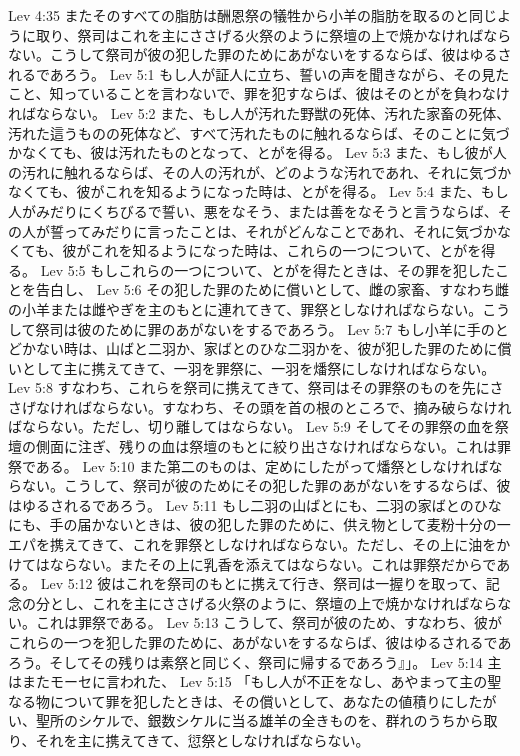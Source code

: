 Lev 4:35  またそのすべての脂肪は酬恩祭の犠牲から小羊の脂肪を取るのと同じように取り、祭司はこれを主にささげる火祭のように祭壇の上で焼かなければならない。こうして祭司が彼の犯した罪のためにあがないをするならば、彼はゆるされるであろう。
Lev 5:1  もし人が証人に立ち、誓いの声を聞きながら、その見たこと、知っていることを言わないで、罪を犯すならば、彼はそのとがを負わなければならない。
Lev 5:2  また、もし人が汚れた野獣の死体、汚れた家畜の死体、汚れた這うものの死体など、すべて汚れたものに触れるならば、そのことに気づかなくても、彼は汚れたものとなって、とがを得る。
Lev 5:3  また、もし彼が人の汚れに触れるならば、その人の汚れが、どのような汚れであれ、それに気づかなくても、彼がこれを知るようになった時は、とがを得る。
Lev 5:4  また、もし人がみだりにくちびるで誓い、悪をなそう、または善をなそうと言うならば、その人が誓ってみだりに言ったことは、それがどんなことであれ、それに気づかなくても、彼がこれを知るようになった時は、これらの一つについて、とがを得る。
Lev 5:5  もしこれらの一つについて、とがを得たときは、その罪を犯したことを告白し、
Lev 5:6  その犯した罪のために償いとして、雌の家畜、すなわち雌の小羊または雌やぎを主のもとに連れてきて、罪祭としなければならない。こうして祭司は彼のために罪のあがないをするであろう。
Lev 5:7  もし小羊に手のとどかない時は、山ばと二羽か、家ばとのひな二羽かを、彼が犯した罪のために償いとして主に携えてきて、一羽を罪祭に、一羽を燔祭にしなければならない。
Lev 5:8  すなわち、これらを祭司に携えてきて、祭司はその罪祭のものを先にささげなければならない。すなわち、その頭を首の根のところで、摘み破らなければならない。ただし、切り離してはならない。
Lev 5:9  そしてその罪祭の血を祭壇の側面に注ぎ、残りの血は祭壇のもとに絞り出さなければならない。これは罪祭である。
Lev 5:10  また第二のものは、定めにしたがって燔祭としなければならない。こうして、祭司が彼のためにその犯した罪のあがないをするならば、彼はゆるされるであろう。
Lev 5:11  もし二羽の山ばとにも、二羽の家ばとのひなにも、手の届かないときは、彼の犯した罪のために、供え物として麦粉十分の一エパを携えてきて、これを罪祭としなければならない。ただし、その上に油をかけてはならない。またその上に乳香を添えてはならない。これは罪祭だからである。
Lev 5:12  彼はこれを祭司のもとに携えて行き、祭司は一握りを取って、記念の分とし、これを主にささげる火祭のように、祭壇の上で焼かなければならない。これは罪祭である。
Lev 5:13  こうして、祭司が彼のため、すなわち、彼がこれらの一つを犯した罪のために、あがないをするならば、彼はゆるされるであろう。そしてその残りは素祭と同じく、祭司に帰するであろう』」。
Lev 5:14  主はまたモーセに言われた、
Lev 5:15  「もし人が不正をなし、あやまって主の聖なる物について罪を犯したときは、その償いとして、あなたの値積りにしたがい、聖所のシケルで、銀数シケルに当る雄羊の全きものを、群れのうちから取り、それを主に携えてきて、愆祭としなければならない。
